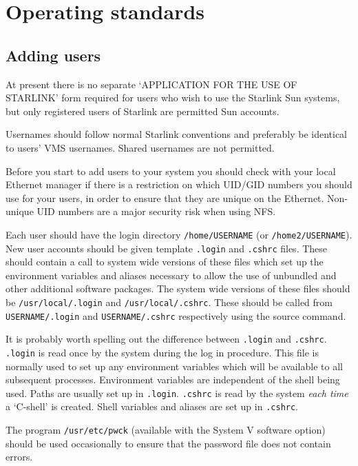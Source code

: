 \section{Operating standards}

\subsection{Adding users}

At present there is no separate `APPLICATION FOR THE USE OF STARLINK' form required
for users who wish to use the Starlink Sun systems, but only registered users
of Starlink are permitted Sun accounts.

Usernames should follow normal Starlink conventions and preferably be identical
to users' VMS usernames.
Shared usernames are not permitted.

Before you start to add users to your system you should check with your local
Ethernet manager if there is a restriction on which UID/GID numbers you should
use for your users, in order to ensure that they are unique on the Ethernet.
Non-unique UID numbers are a major security risk when using NFS.

Each user should have the login directory {\tt /home/USERNAME}
(or {\tt /home2/USERNAME}).
New user accounts should be given template {\tt .login} and {\tt .cshrc} files. These
should contain a call to system wide versions of these files which set up
the environment variables and aliases necessary to allow the use of unbundled
and other additional software packages. The system wide versions of these
files should be {\tt /usr/local/.login} and {\tt /usr/local/.cshrc}. These should be
called from {\tt USERNAME/.login} and {\tt USERNAME/.cshrc} respectively using the source command.

It is probably worth spelling out the difference between {\tt .login} and
{\tt.cshrc}.
{\tt .login} is read once by the system during the log in procedure. This file is
normally used to set up any environment variables which will be available
to all subsequent processes. Environment variables are independent of the
shell being used. Paths are usually set up in {\tt .login}.
{\tt .cshrc} is read by the system {\it each time}\, a `C-shell' is created.
Shell variables and aliases are set up in {\tt .cshrc}.

The program {\tt /usr/etc/pwck} (available with the System V software option) should
be used occasionally to ensure that the password file does not contain errors.

